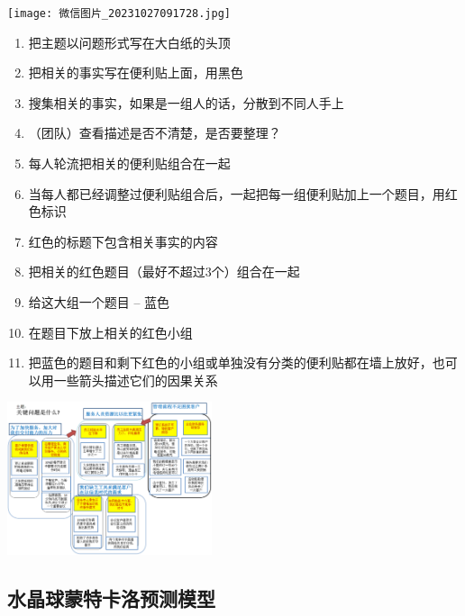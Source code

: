 \texttt{[image: 微信图片\_20231027091728.jpg]}

\begin{description}
\item[]
\begin{description}
\tightlist
\item[]
\end{description}
\end{description}

\begin{enumerate}
\tightlist
\item
  把主题以问题形式写在大白纸的头顶
\item
  把相关的事实写在便利贴上面，用黑色
\item
  搜集相关的事实，如果是一组人的话，分散到不同人手上
\item
  （团队）查看描述是否不清楚，是否要整理？
\item
  每人轮流把相关的便利贴组合在一起
\item
  当每人都已经调整过便利贴组合后，一起把每一组便利贴加上一个题目，用红色标识
\item
  红色的标题下包含相关事实的内容
\item
  把相关的红色题目（最好不超过3个）组合在一起
\item
  给这大组一个题目 -- 蓝色
\item
  在题目下放上相关的红色小组
\item
  把蓝色的题目和剩下红色的小组或单独没有分类的便利贴都在墙上放好，也可以用一些箭头描述它们的因果关系

\end{enumerate}


\includegraphics[width=6cm]{KJ_10.png}

\hypertarget{ux6c34ux6676ux7403ux8499ux7279ux5361ux6d1bux9884ux6d4bux6a21ux578b}{%
\subsection{水晶球蒙特卡洛预测模型}\label{ux6c34ux6676ux7403ux8499ux7279ux5361ux6d1bux9884ux6d4bux6a21ux578b}}

